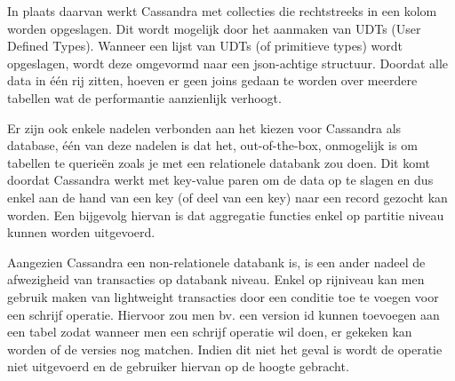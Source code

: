 \documentclass{article}
\begin{document}
	In plaats daarvan werkt Cassandra met collecties die rechtstreeks in een kolom worden opgeslagen. 
	Dit wordt mogelijk door het aanmaken van UDTs (User Defined Types). 
	Wanneer een lijst van UDTs (of primitieve types) wordt opgeslagen, wordt deze omgevormd naar een json-achtige structuur. 
	Doordat alle data in één rij zitten, hoeven er geen joins gedaan te worden over meerdere tabellen 
	wat de performantie aanzienlijk verhoogt.
	\par
	Er zijn ook enkele nadelen verbonden aan het kiezen voor Cassandra als database, één van deze nadelen is dat het, out-of-the-box,
	onmogelijk is om tabellen te querieën zoals je met een relationele databank zou doen. 
	Dit komt doordat Cassandra werkt met key-value paren om de data op te slagen en dus enkel aan de hand van een key 
	(of deel van een key) naar een record gezocht kan worden. 
	Een bijgevolg hiervan is dat aggregatie functies enkel op partitie niveau kunnen worden uitgevoerd.
	\par
	Aangezien Cassandra een non-relationele databank is, is een ander nadeel de afwezigheid van transacties op databank niveau.
	Enkel op rijniveau kan men gebruik maken van lightweight transacties door een conditie toe te voegen voor een schrijf operatie.
	Hiervoor zou men bv. een version id kunnen toevoegen aan een tabel zodat wanneer men een schrijf operatie wil doen,
	er gekeken kan worden of de versies nog matchen. 
	Indien dit niet het geval is wordt de operatie niet uitgevoerd en de gebruiker hiervan op de hoogte gebracht.
\end{document}

